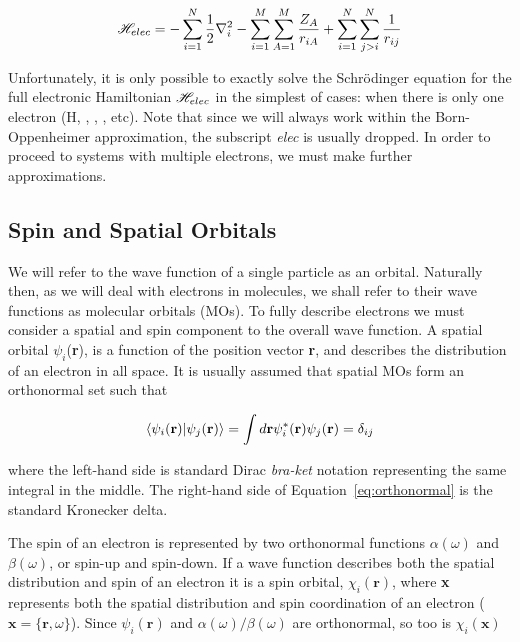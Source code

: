 \begin{doublespace}
\begin{equation}
  \mathscr{H}_{elec} = -\sum_{i=1}^N \frac{1}{2}\nabla_i^2  -\sum_{i=1}^M\sum_{A=1}^M\frac{Z_A}{r_{iA}}
  + \sum_{i=1}^N\sum_{j>i}^N \frac{1}{r_{ij}}
\label{eq:hamelect}
\end{equation}

\noindent Unfortunately, it is only possible to exactly solve the
Schr{\"o}dinger equation for the full electronic Hamiltonian $\mathscr{H}_{elec}$ in
the simplest of cases: when there is only one electron (H, ,
, , etc). Note that since we will always work within the
Born-Oppenheimer approximation, the subscript \emph{elec} is usually dropped.
In order to proceed to systems with multiple electrons, we must make further
approximations.

\subsection{Spin and Spatial Orbitals}

We will refer to the wave function of a single particle as an orbital.
Naturally then, as we will deal with electrons in molecules, we shall refer to
their wave functions as molecular orbitals (MOs). To fully describe electrons
we must consider a spatial and spin component to the overall wave function. A
spatial orbital $\psi_i$(\textbf{r}), is a function of the position vector
\textbf{r}, and describes the distribution of an electron in all space. It is
usually assumed that spatial MOs form an orthonormal set such that

\begin{equation}
\bra{\psi_i(\mathbf{r})}\ket{\psi_j(\mathbf{r})} =
\int d\mathbf{r} \psi_i^*(\mathbf{r})\psi_j(\mathbf{r}) = \delta_{ij}
\label{eq:orthonormal}
\end{equation}

\noindent where the left-hand side is standard Dirac \emph{bra-ket} notation
representing the same integral in the middle. The right-hand side of
Equation~\ref{eq:orthonormal} is the standard Kronecker delta.

The spin of an electron is represented by two orthonormal functions
$\alpha(\omega)$ and $\beta(\omega)$, or spin-up and spin-down. If a wave
function describes both the spatial distribution and spin of an electron it is
a spin orbital, $\chi_i(\mathbf{r})$, where \textbf{x} represents both the
spatial distribution and spin coordination of an electron ($\mathbf{x} = \{
\mathbf{r}, \omega \}$). Since $\psi_i(\mathbf{r})$ and
$\alpha(\omega)/\beta(\omega)$ are orthonormal, so too is $\chi_i(\mathbf{x})$


\end{doublespace}
